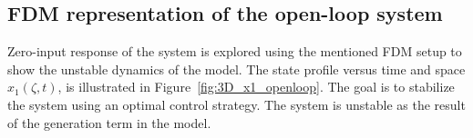 
\subsection{FDM representation of the open-loop system}

Zero-input response of the system is explored using the mentioned FDM setup to show the unstable dynamics of the model. The state profile versus time and space $x_1(\zeta,t)$, is illustrated in Figure~\ref{fig:3D_x1_openloop}. The goal is to stabilize the system using an optimal control strategy. The system is unstable as the result of the generation term in the model.

